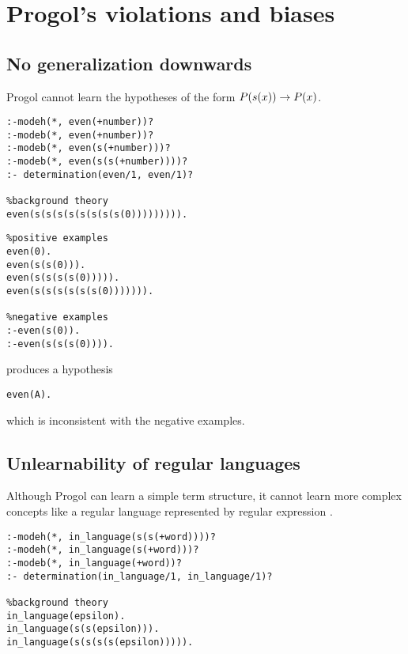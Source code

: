 \section{Progol's violations and biases}
\subsection{No generalization downwards}\label{progol_no_generalization_downwards}
Progol cannot learn the hypotheses of the form $P(s(x)) \to P(x)$.

\begin{minipage}[t]{.60\textwidth}
\begin{lstlisting}
:-modeh(*, even(+number))?
:-modeb(*, even(+number))?
:-modeb(*, even(s(+number)))?
:-modeb(*, even(s(s(+number))))?
:- determination(even/1, even/1)?

%background theory
even(s(s(s(s(s(s(s(s(0))))))))).
\end{lstlisting}
\end{minipage}
\begin{minipage}[t]{.20\textwidth}
\begin{lstlisting}
%positive examples
even(0).
even(s(s(0))).
even(s(s(s(s(0))))).
even(s(s(s(s(s(s(0))))))).

%negative examples
:-even(s(0)).
:-even(s(s(s(0)))).
\end{lstlisting}
\end{minipage}

produces a hypothesis
\begin{lstlisting}
even(A).
\end{lstlisting}
which is inconsistent with the negative examples.

\subsection{Unlearnability of regular languages}\label{progol_unlearnability_of_regular_languages}
Although Progol can learn a simple term structure, it cannot learn more complex concepts like a regular language represented by regular expression .

\begin{lstlisting}
:-modeh(*, in_language(s(s(+word))))?
:-modeh(*, in_language(s(+word)))?
:-modeb(*, in_language(+word))?
:- determination(in_language/1, in_language/1)?

%background theory
in_language(epsilon).
in_language(s(s(epsilon))).
in_language(s(s(s(s(epsilon))))).
\end{lstlisting}

